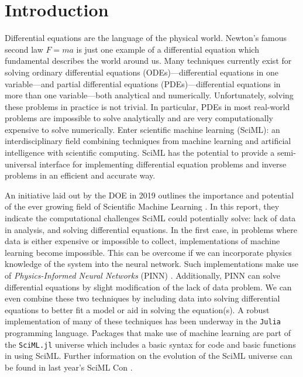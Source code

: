 \documentclass{CUP-JNL-DTM}%
\theoremstyle{definition}
\numberwithin{equation}{section}
\newcommand{\Julia}{\texttt{Julia} }
\begin{document}
\localtableofcontents


\section{Introduction}

Differential equations are the language of the physical world. Newton's famous second law $F=ma$ is just one example of a differential equation which fundamental describes the world around us. Many techniques currently exist for solving ordinary differential equations (ODEs)---differential equations in one variable---and partial differential equations (PDEs)---differential equations in more than one variable---both analytical and numerically. Unfortunately, solving these problems in practice is not trivial. In particular, PDEs in most real-world problems are impossible to solve analytically and are very computationally expensive to solve numerically. Enter scientific machine learning (SciML): an interdisciplinary field combining techniques from machine learning and artificial intelligence with scientific computing. SciML has the potential to provide a semi-universal interface for implementing differential equation problems and inverse problems in an efficient and accurate way. 

An initiative laid out by the DOE in 2019 outlines the importance and potential of the ever growing field of Scientific Machine Learning \cite{bakerWorkshopReportBasic2019}. In this report, they indicate the computational challenges SciML could potentially solve: lack of data in analysis, and solving differential equations. In the first case, in problems where data is either expensive or impossible to collect, implementations of machine learning become impossible. This can be overcome if we can incorporate physics knowledge of the system into the neural network. Such implementations make use of \emph{Physics-Informed Neural Networks} (PINN) \cite{karniadakisPhysicsinformedMachineLearning2021}. Additionally, PINN can solve differential equations by slight modification of the lack of data problem. We can even combine these two techniques by including data into solving differential equations to better fit a model or aid in solving the equation(s). A robust implementation of many of these techniques has been underway in the \Julia programming language. Packages that make use of machine learning are part of the \texttt{SciML.jl} universe which includes a basic syntax for code and basic functions in using SciML. Further information on the evolution of the SciML universe can be found in last year's SciML Con \cite{SciMLCon2022}. 
\end{document}
